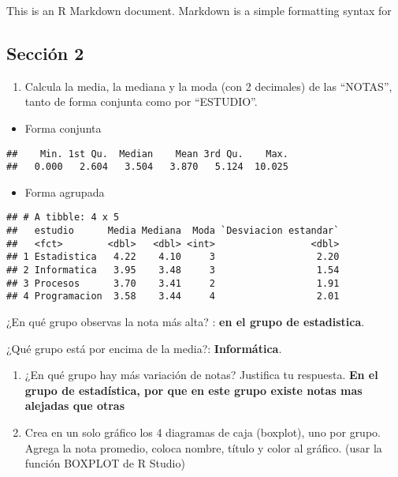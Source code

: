 \documentclass[]{article}
\providecommand{\tightlist}{%
  \setlength{\itemsep}{0pt}\setlength{\parskip}{0pt}}
\begin{document}
This is an R Markdown document. Markdown is a simple formatting syntax
for

\hypertarget{secciuxf3n-2}{%
\subsection{Sección 2}\label{secciuxf3n-2}}

\begin{enumerate}
\def\labelenumi{\alph{enumi})}
\tightlist
\item
  Calcula la media, la mediana y la moda (con 2 decimales) de las
  ``NOTAS'', tanto de forma conjunta como por ``ESTUDIO''.
\end{enumerate}

\begin{itemize}
\tightlist
\item
  Forma conjunta
\end{itemize}

\begin{verbatim}
##    Min. 1st Qu.  Median    Mean 3rd Qu.    Max. 
##   0.000   2.604   3.504   3.870   5.124  10.025
\end{verbatim}

\begin{itemize}
\tightlist
\item
  Forma agrupada
\end{itemize}

\begin{verbatim}
## # A tibble: 4 x 5
##   estudio      Media Mediana  Moda `Desviacion estandar`
##   <fct>        <dbl>   <dbl> <int>                 <dbl>
## 1 Estadistica   4.22    4.10     3                  2.20
## 2 Informatica   3.95    3.48     3                  1.54
## 3 Procesos      3.70    3.41     2                  1.91
## 4 Programacion  3.58    3.44     4                  2.01
\end{verbatim}

¿En qué grupo observas la nota más alta? : \textbf{en el grupo de
estadistica}.

¿Qué grupo está por encima de la media?: \textbf{Informática}.

\begin{enumerate}
\def\labelenumi{\alph{enumi})}
\setcounter{enumi}{1}
\tightlist
\item
  ¿En qué grupo hay más variación de notas? Justifica tu respuesta.
  \textbf{En el grupo de estadística, por que en este grupo existe notas
  mas alejadas que otras}
\item
  Crea en un solo gráfico los 4 diagramas de caja (boxplot), uno por
  grupo. Agrega la nota promedio, coloca nombre, título y color al
  gráfico. (usar la función BOXPLOT de R Studio)
\end{enumerate}
\end{document}
